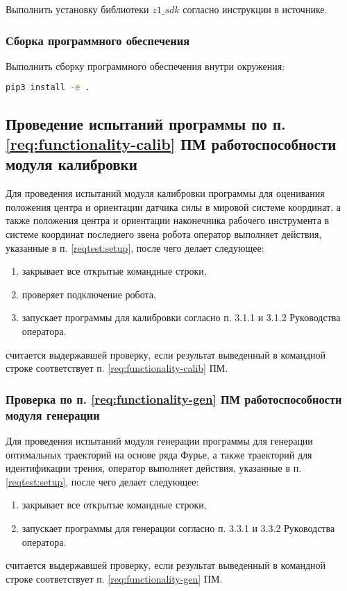 Выполнить установку библиотеки $z1\_sdk$ согласно инструкции в источнике.

\subsubsection{Сборка программного обеспечения}

Выполнить сборку программного обеспечения внутри окружения:
\begin{lstlisting}[language=bash, numbers=none, frame=single]
    pip3 install -e .
\end{lstlisting}

\subsection{Проведение испытаний программы \productname по п. \ref{req:functionality-calib} ПМ работоспособности модуля калибровки} \label{reqtest:functionality-calib}
Для проведения испытаний модуля калибровки программы \productname для оценивания положения центра и ориентации датчика силы в мировой системе координат, а также положения центра и ориентации наконечника рабочего инструмента в системе координат последнего звена робота оператор выполняет действия, указанные в п. \ref{reqtest:setup}, после чего делает следующее:
\begin{enumerate}
    \item закрывает все открытые командные строки,
    \item проверяет подключение робота,
    \item запускает программы для калибровки согласно п. 3.1.1 и 3.1.2 Руководства оператора.
\end{enumerate}
 \programname считается выдержавшей проверку, если результат выведенный в командной строке соответствует п. \ref{req:functionality-calib} ПМ.


\subsubsection{Проверка по п. \ref{req:functionality-gen} ПМ работоспособности модуля генерации} \label{reqtest:functionality-gen}

Для проведения испытаний модуля генерации программы \productname для генерации оптимальных траекторий на основе ряда Фурье, а также траекторий для идентификации трения, оператор выполняет действия, указанные в п. \ref{reqtest:setup}, после чего делает следующее:
\begin{enumerate}
    \item закрывает все открытые командные строки,
    \item запускает программы для генерации согласно п. 3.3.1 и 3.3.2 Руководства оператора.
\end{enumerate}
\programname считается выдержавшей проверку, если результат выведенный в командной строке соответствует п. \ref{req:functionality-gen} ПМ.

